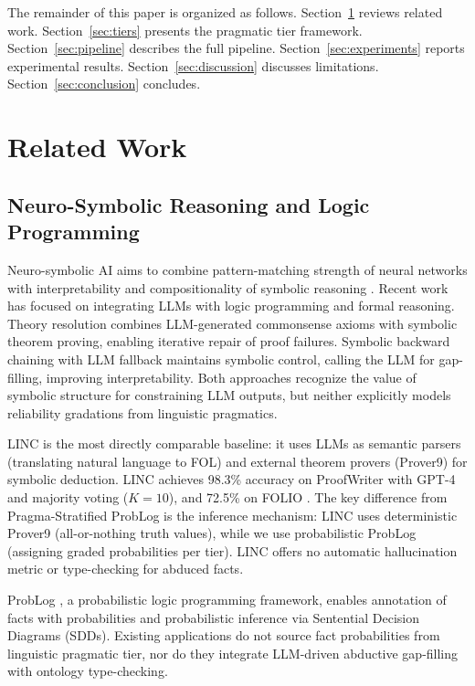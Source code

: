 \documentclass[11pt,letterpaper]{article}
\begin{document}
The remainder of this paper is organized as follows. Section~\ref{sec:related} reviews related work. Section~\ref{sec:tiers} presents the pragmatic tier framework. Section~\ref{sec:pipeline} describes the full pipeline. Section~\ref{sec:experiments} reports experimental results. Section~\ref{sec:discussion} discusses limitations. Section~\ref{sec:conclusion} concludes.

\section{Related Work}
\label{sec:related}

\subsection{Neuro-Symbolic Reasoning and Logic Programming}

Neuro-symbolic AI aims to combine pattern-matching strength of neural networks with interpretability and compositionality of symbolic reasoning \citep{Bessler2023}. Recent work has focused on integrating LLMs with logic programming and formal reasoning. Theory resolution \citep{Thawani2024} combines LLM-generated commonsense axioms with symbolic theorem proving, enabling iterative repair of proof failures. Symbolic backward chaining with LLM fallback \citep{Weir2024} maintains symbolic control, calling the LLM for gap-filling, improving interpretability. Both approaches recognize the value of symbolic structure for constraining LLM outputs, but neither explicitly models reliability gradations from linguistic pragmatics.

LINC \citep{Olausson2023} is the most directly comparable baseline: it uses LLMs as semantic parsers (translating natural language to FOL) and external theorem provers (Prover9) for symbolic deduction. LINC achieves 98.3\% accuracy on ProofWriter with GPT-4 and majority voting ($K=10$), and 72.5\% on FOLIO \citep{Olausson2023}. The key difference from Pragma-Stratified ProbLog is the inference mechanism: LINC uses deterministic Prover9 (all-or-nothing truth values), while we use probabilistic ProbLog (assigning graded probabilities per tier). LINC offers no automatic hallucination metric or type-checking for abduced facts.

ProbLog \citep{DeRaedt2007}, a probabilistic logic programming framework, enables annotation of facts with probabilities and probabilistic inference via Sentential Decision Diagrams (SDDs). Existing applications do not source fact probabilities from linguistic pragmatic tier, nor do they integrate LLM-driven abductive gap-filling with ontology type-checking.
\end{document}
